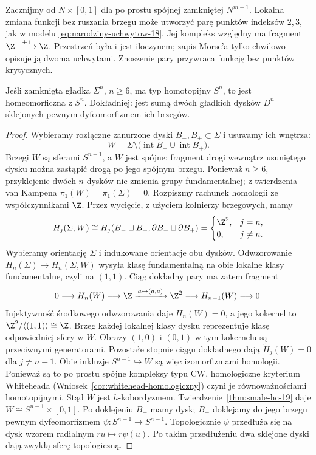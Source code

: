 \begin{przyklad}
Zacznijmy od
$N\times[0,1]$ dla
po prostu spójnej
zamkniętej $N^{m-1}$.
Lokalna zmiana
funkcji bez ruszania
brzegu może utworzyć
parę punktów
indeksów $2,3$,
jak w modelu
\eqref{eq:narodziny-uchwytow-18}.
Jej kompleks względny
ma fragment
$\Z\xrightarrow{\ \pm1\ }\Z$.
Przestrzeń była i jest
iloczynem; zapis
Morse'a tylko
chwilowo opisuje ją
dwoma uchwytami.
Znoszenie pary
przywraca funkcję
bez punktów krytycznych.
\end{przyklad}

\begin{wniosek}
\label{wn:homotopijna-sfera-19}
Jeśli zamknięta gładka
$\Sigma^n$, $n\geq6$,
ma typ homotopijny
$S^n$, to jest
homeomorficzna z $S^n$.
Dokładniej: jest sumą
dwóch gładkich dysków
$D^n$ sklejonych
pewnym dyfeomorfizmem
ich brzegów.
\end{wniosek}
\begin{proof}
Wybieramy rozłączne
zanurzone dyski
$B_-,B_+\subset\Sigma$
i usuwamy ich wnętrza:
\[
 W=\Sigma\setminus
   \bigl(\operatorname{int}B_-
          \cup\operatorname{int}B_+\bigr).
\]
Brzegi $W$ są sferami $S^{n-1}$, a $W$ jest spójne:
fragment drogi wewnątrz usuniętego dysku można zastąpić drogą
po jego spójnym brzegu.
Ponieważ $n\geq6$,
przyklejenie dwóch
$n$-dysków nie zmienia
grupy fundamentalnej;
z twierdzenia van Kampena
$\pi_1(W)=\pi_1(\Sigma)=0$.
Rozpiszmy rachunek homologii ze współczynnikami $\Z$.
Przez wycięcie, z użyciem kołnierzy brzegowych, mamy
\[
 H_j(\Sigma,W)\cong
 H_j(B_-\sqcup B_+,\partial B_-\sqcup\partial B_+)
 =\begin{cases}\Z^2,&j=n,\\0,&j\ne n.\end{cases}
\]
Wybieramy orientację $\Sigma$ i indukowane orientacje obu dysków.
Odwzorowanie $H_n(\Sigma)\to H_n(\Sigma,W)$ wysyła klasę
fundamentalną na obie lokalne klasy fundamentalne, czyli na $(1,1)$.
Ciąg dokładny pary ma zatem fragment
\[
 0\longrightarrow H_n(W)\longrightarrow\Z
 \xrightarrow{\,a\mapsto(a,a)\,}\Z^2
 \longrightarrow H_{n-1}(W)\longrightarrow0.
\]
Injektywność środkowego odwzorowania daje $H_n(W)=0$, a jego
kokernel to $\Z^2/\langle(1,1)\rangle\cong\Z$.
Brzeg każdej lokalnej klasy dysku reprezentuje klasę odpowiedniej
sfery w $W$. Obrazy $(1,0)$ i $(0,1)$ w tym kokernelu są
przeciwnymi generatorami. Pozostałe stopnie ciągu dokładnego
dają $\widetilde H_j(W)=0$ dla $j\ne n-1$.
Obie inkluzje
$S^{n-1}\hookrightarrow W$
są więc izomorfizmami
homologii. Ponieważ
są to po prostu spójne
kompleksy typu CW,
homologiczne kryterium Whiteheada
(Wniosek~\ref{cor:whitehead-homologiczny})
czyni je równoważnościami
homotopijnymi.
Stąd $W$ jest
$h$-kobordyzmem.
Twierdzenie~\ref{thm:smale-hc-19}
daje $W\cong S^{n-1}\times[0,1]$.
Po doklejeniu $B_-$ mamy
dysk; $B_+$ doklejamy
do jego brzegu pewnym
dyfeomorfizmem
$\psi:S^{n-1}\to S^{n-1}$.
Topologicznie $\psi$
przedłuża się na dysk
wzorem radialnym
$r u\mapsto r\psi(u)$.
Po takim przedłużeniu
dwa sklejone dyski
dają zwykłą sferę
topologiczną.
\end{proof}

